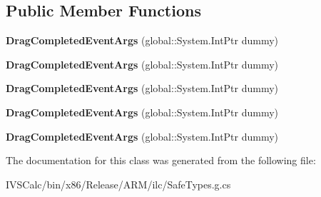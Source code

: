 \subsection*{Public Member Functions}
\begin{DoxyCompactItemize}
\item 
\mbox{\label{class_windows_1_1_u_i_1_1_xaml_1_1_controls_1_1_primitives_1_1_drag_completed_event_args_afc823e734434283bc7d8bff58a58932e}} 
{\bfseries Drag\+Completed\+Event\+Args} (global\+::\+System.\+Int\+Ptr dummy)
\item 
\mbox{\label{class_windows_1_1_u_i_1_1_xaml_1_1_controls_1_1_primitives_1_1_drag_completed_event_args_afc823e734434283bc7d8bff58a58932e}} 
{\bfseries Drag\+Completed\+Event\+Args} (global\+::\+System.\+Int\+Ptr dummy)
\item 
\mbox{\label{class_windows_1_1_u_i_1_1_xaml_1_1_controls_1_1_primitives_1_1_drag_completed_event_args_afc823e734434283bc7d8bff58a58932e}} 
{\bfseries Drag\+Completed\+Event\+Args} (global\+::\+System.\+Int\+Ptr dummy)
\item 
\mbox{\label{class_windows_1_1_u_i_1_1_xaml_1_1_controls_1_1_primitives_1_1_drag_completed_event_args_afc823e734434283bc7d8bff58a58932e}} 
{\bfseries Drag\+Completed\+Event\+Args} (global\+::\+System.\+Int\+Ptr dummy)
\item 
\mbox{\label{class_windows_1_1_u_i_1_1_xaml_1_1_controls_1_1_primitives_1_1_drag_completed_event_args_afc823e734434283bc7d8bff58a58932e}} 
{\bfseries Drag\+Completed\+Event\+Args} (global\+::\+System.\+Int\+Ptr dummy)
\end{DoxyCompactItemize}


The documentation for this class was generated from the following file\+:\begin{DoxyCompactItemize}
\item 
I\+V\+S\+Calc/bin/x86/\+Release/\+A\+R\+M/ilc/Safe\+Types.\+g.\+cs\end{DoxyCompactItemize}
